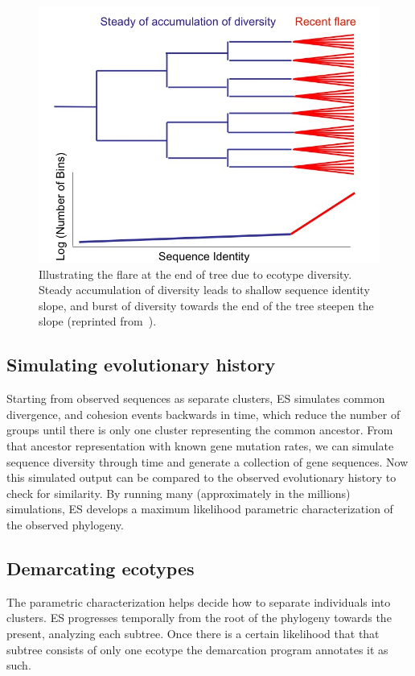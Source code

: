 \begin{figure}[h!]
\centering
\includegraphics[scale=0.45]{images/TreeFlare-CH2}
\caption[Illustrating the flare at the end of tree due to ecotype diversity.]{Illustrating the flare at the end of tree due to ecotype diversity. Steady accumulation of diversity leads to shallow sequence identity slope, and burst of diversity towards the end of the tree steepen the slope (reprinted from~\protect\cite{fredImage}).}
\label{fig:TreeFlare}
\end{figure}

\subsection*{Simulating evolutionary history}
Starting from observed sequences as separate clusters, ES simulates common divergence, and cohesion events backwards in time, which reduce the number of groups until there is only one cluster representing the common ancestor.
From that ancestor representation with known gene mutation rates, we can simulate sequence diversity through time and generate a collection of gene sequences.
Now this simulated output can be compared to the observed evolutionary history to check for similarity.
By running many (approximately in the millions) simulations, ES develops a maximum likelihood parametric characterization of the observed phylogeny. 

\subsection*{Demarcating ecotypes}
The parametric characterization helps decide how to separate individuals into clusters.
ES progresses temporally from the root of the phylogeny towards the present, analyzing each subtree.
Once there is a certain likelihood that that subtree consists of only one ecotype the demarcation program annotates it as such.



